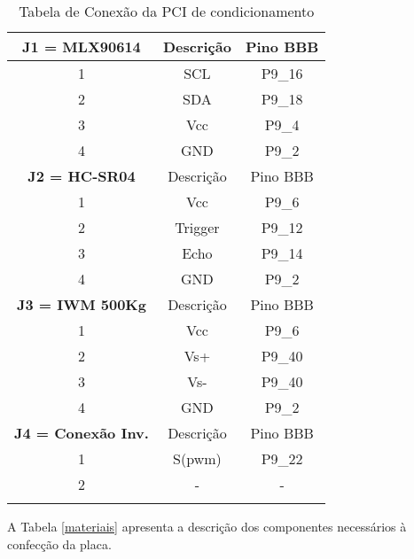 	\newpage
	\begin{table}[!h]
	\centering
	\caption{Tabela de Conexão da PCI de condicionamento}
	\begin{tabular}{ c c c }
	\hline
	\textbf{J1 = MLX90614}	& Descrição & Pino BBB\\
	\hline
	1		&	SCL &	P9\_16\\
	\hline
	2		&	SDA &	P9\_18\\
	\hline
	3		&	Vcc &	P9\_4\\
	\hline
	4		&	GND &	P9\_2\\
	\hline
	\textbf{J2 = HC-SR04}	& Descrição & Pino BBB\\
	\hline
	1		&	Vcc &	P9\_6\\
	\hline
	2		&	Trigger &	P9\_12\\
	\hline
	3		&	Echo &	P9\_14\\
	\hline
	4		&	GND &	P9\_2\\
	\hline
	\textbf{J3 = IWM 500Kg}	& Descrição & Pino BBB\\
	\hline
	1		&	Vcc &	P9\_6\\
	\hline
	2		&	Vs+ &	P9\_40\\
	\hline
	3		&	Vs- &	P9\_40\\
	\hline
	4		&	GND &	P9\_2\\
	\hline
	\textbf{J4 = Conexão Inv.}	& Descrição & Pino BBB\\
	\hline
	1		&	S(pwm) &	P9\_22\\
	\hline
	2		&	- &	-\\
	\hline


	\label{conexao}
	\end{tabular}
	\end{table}


	A Tabela \ref{materiais} apresenta a descrição dos componentes necessários à confecção da placa.


